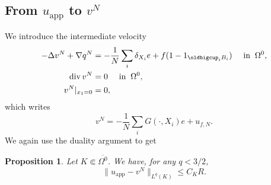 \documentclass[JEP,XML,SOM,Unicode,NoEqCountersInSection,published]{cedram}
\newcommand{\app}{\mathrm{app}}
\renewcommand{\div}{\operatorname{div}}
\theoremstyle{plain}
\newtheorem{prop}[thm]{Proposition}
\theoremstyle{definition}
\let\na\nabla
\begin{document}
\subsection{From $u_{\app}$ to $v^N$}
We introduce the intermediate velocity
\begin{equation} \label{eq:Stokes_v^N}
\begin{aligned}
-\Delta v^N + \na q^N & =-\frac{1}{N} \sum_i\delta_{X_i} e+f(1-1_{\oldbigcup_i B_i}) \quad \text{ in } \: \Omega^0, \\
\div v^N & = 0 \quad \text{ in } \: \Omega^0, \\
v^N \vert_{x_1=0} & = 0,
\end{aligned}
\end{equation}
which writes
\[
v^N=-\frac{1}{N}\sum_iG(\cdot,X_i) e+u_{f,N}.
\]
We again use the duality argument to get
\begin{prop}
Let $K \Subset \overline{\Omega^0}$. We have, for any $q<3/2$,
\[
\| u_{\app}- v^N\|_{L^q(K)} \leq C_K R.
\]
\end{prop}
\end{document}
